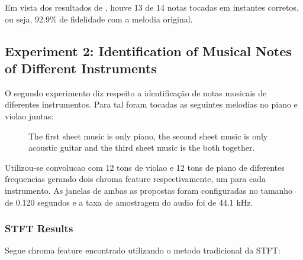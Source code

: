 \documentclass{article}
\begin{document}
	Em vista dos resultados de , houve 13 de 14 notas tocadas em instantes corretos, ou seja, 92.9\% de fidelidade com a melodia original.


	\subsection{Experiment 2: Identification of Musical Notes of Different Instruments}

	O segundo experimento diz respeito a identificação de notas musicais de diferentes instrumentos. Para tal foram tocadas as seguintes melodias no piano e violao juntas:

	\begin{figure}[h]
	 \centerline{}
	 \centerline{}
	 \centerline{}
	 \caption{The first sheet music is only piano, the second sheet music is only acoustic guitar and the third sheet music is the both together.}
	 \label{fig:1-ssft}
	\end{figure}

Utilizou-se convolucao com 12 tons de violao e 12 tons de piano de diferentes frequencias gerando dois chroma feature respectivamente, um para cada instrumento. As janelas de ambas as propostas foram configuradas no tamanho de 0.120 segundos e a taxa de amostragem do audio foi de 44.1 kHz.

	\subsubsection{STFT Results}
	Segue chroma feature encontrado utilizando o metodo tradicional da STFT:
	
\end{document}
